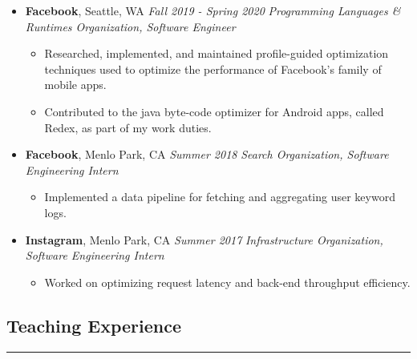 \documentclass[10pt]{article}
\begin{document}
\begin{itemize}
    \item
        \textbf{Facebook}, Seattle, WA \hfill \emph{Fall 2019 - Spring 2020} \linebreak
        \emph{Programming Languages \& Runtimes Organization, Software Engineer}
        \begin{itemize}
            \item Researched, implemented, and maintained profile-guided optimization techniques used to optimize the performance of Facebook's family of mobile apps.
            \item Contributed to the java byte-code optimizer for Android apps, called Redex, as part of my work duties.
        \end{itemize}
    \item
        \textbf{Facebook}, Menlo Park, CA \hfill \emph{Summer 2018} \linebreak
        \emph{Search Organization, Software Engineering Intern}
        \begin{itemize}
            \item Implemented a data pipeline for fetching and aggregating user keyword logs.
        \end{itemize}
    \item
        \textbf{Instagram}, Menlo Park, CA \hfill \emph{Summer 2017} \linebreak
        \emph{Infrastructure Organization, Software Engineering Intern}
        \begin{itemize}
            \item Worked on optimizing request latency and back-end throughput efficiency.
        \end{itemize}
\end{itemize}

\subsection*{Teaching Experience}
\vspace*{-\baselineskip}
\noindent\rule{\linewidth}{0.4pt}
\end{document}
